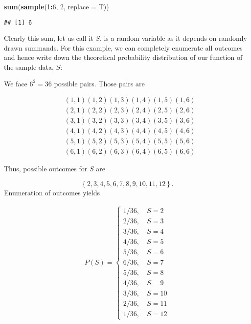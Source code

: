 \documentclass[]{book}
\newenvironment{Shaded}{\begin{snugshade}}{\end{snugshade}}
\newcommand{\KeywordTok}[1]{\textcolor[rgb]{0.13,0.29,0.53}{\textbf{#1}}}
\newcommand{\DataTypeTok}[1]{\textcolor[rgb]{0.13,0.29,0.53}{#1}}
\newcommand{\DecValTok}[1]{\textcolor[rgb]{0.00,0.00,0.81}{#1}}
\newcommand{\OperatorTok}[1]{\textcolor[rgb]{0.81,0.36,0.00}{\textbf{#1}}}
\newcommand{\NormalTok}[1]{#1}
\theoremstyle{definition}
\theoremstyle{definition}
\theoremstyle{definition}
\theoremstyle{remark}
\begin{document}
\begin{Shaded}
\begin{Highlighting}[]
\KeywordTok{sum}\NormalTok{(}\KeywordTok{sample}\NormalTok{(}\DecValTok{1}\OperatorTok{:}\DecValTok{6}\NormalTok{, }\DecValTok{2}\NormalTok{, }\DataTypeTok{replace =}\NormalTok{ T))}
\end{Highlighting}
\end{Shaded}

\begin{verbatim}
## [1] 6
\end{verbatim}

Clearly this sum, let us call it \(S\), is a random variable as it
depends on randomly drawn summands. For this example, we can completely
enumerate all outcomes and hence write down the theoretical probability
distribution of our function of the sample data, \(S\):

We face \(6^2=36\) possible pairs. Those pairs are

\begin{align}
  &(1,1)    (1,2)   (1,3)   (1,4)   (1,5)   (1,6) \\ 
  &(2,1)    (2,2)   (2,3)   (2,4)   (2,5)   (2,6) \\ 
  &(3,1)    (3,2)   (3,3)   (3,4)   (3,5)   (3,6) \\ 
  &(4,1)    (4,2)   (4,3)   (4,4)   (4,5)   (4,6) \\ 
  &(5,1)    (5,2)   (5,3)   (5,4)   (5,5)   (5,6) \\ 
  &(6,1)    (6,2)   (6,3)   (6,4)   (6,5)   (6,6)
\end{align}

Thus, possible outcomes for \(S\) are

\[ \left\{ 2,3,4,5,6,7,8,9,10,11,12 \right\} . \] Enumeration of
outcomes yields

\begin{align}
  P(S) = 
  \begin{cases} 
    1/36, \ & S = 2 \\ 
    2/36, \ & S = 3 \\
    3/36, \ & S = 4 \\
    4/36, \ & S = 5 \\
    5/36, \ & S = 6 \\
    6/36, \ & S = 7 \\
    5/36, \ & S = 8 \\
    4/36, \ & S = 9 \\
    3/36, \ & S = 10 \\
    2/36, \ & S = 11 \\
    1/36, \ & S = 12
  \end{cases}
\end{align}
\end{document}
